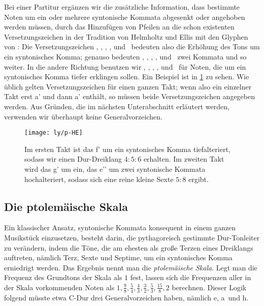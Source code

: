 Bei einer Partitur ergänzen wir die zusätzliche Information, dass bestimmte
Noten um ein oder mehrere syntonische Kommata abgesenkt oder angehoben werden
müssen, durch das Hinzufügen von Pfeilen an die schon existenten
Versetzungszeichen in der Tradition von Helmholtz und Ellis \cite{HE} mit den
Glyphen von \cite{HEJI}: Die Versetzungszeichen \dsharpp, \sharpp, \naturalp,
\flatp, und \dflatp\ bedeuten also die Erhöhung des Tons um ein syntonisches
Komma; genauso bedeuten \dsharppp, \sharppp, \naturalpp, \flatpp, und \dflatpp\
zwei Kommata und so weiter. In die andere Richtung benutzen wir \dsharpm,
\sharpm, \naturalm, \flatm, und \dflatm\ für Noten, die um ein syntonisches
Komma tiefer erklingen sollen. Ein Beispiel ist in \cref{fig:HE} zu sehen. Wie
üblich gelten Versetzungszeichen für einen ganzen Takt; wenn also ein einzelner
Takt erst \naturalm a’ und dann \natural a’ enthält, so müssen beide
Versetzungszeichen angegeben werden. Aus Gründen, die im nächsten Unterabschnitt
erläutert werden, verwenden wir überhaupt keine Generalvorzeichen.\looseness-1

\begin{figure}\centering
  \texttt{[image: ly/p-HE]}
  \caption{Im ersten Takt ist das \sharp f’ um ein syntonisches Komma
    tiefalteriert, sodass wir einen Dur-Dreiklang $4:5:6$ erhalten. Im zweiten
    Takt wird das g’ um ein, das \flat e’’ um zwei syntonische Kommata
    hochalteriert, sodass sich eine reine kleine Sexte $5:8$
    ergibt.}\label{fig:HE}
\end{figure}

\subsection{Die ptolemäische Skala}
\label{subsec:ptol}

Ein klassischer Ansatz, syntonische Kommata konsequent in einem
ganzen Musikstück einzusetzen, besteht darin, die pythagoreisch gestimmte
Dur-Tonleiter zu verändern, indem die Töne, die am ehesten als große Terzen
eines Dreiklangs auftreten, nämlich Terz, Sexte und Septime, um ein syntonisches
Komma erniedrigt werden. Das Ergebnis nennt man die \emph{ptolemäische
  Skala}. Legt man die Frequenz des Grundtons der Skala als $1$ fest, lassen
sich die Frequenzen aller in der Skala vorkommenden Noten als
$1,\frac98,\frac54,\frac43,\frac32,\frac53,\frac{15}8,2$ berechnen. Dieser Logik
folgend müsste etwa C-Dur drei Generalvorzeichen haben, nämlich \naturalm e,
\naturalm a\ und \naturalm h.

